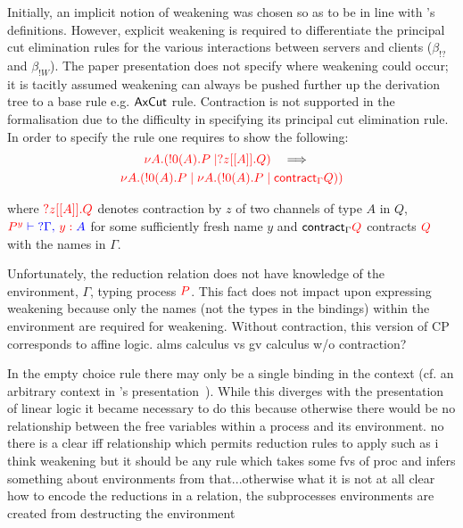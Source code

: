 Initially, an implicit notion of weakening was chosen so as to be in line with
\citeauthor{Wadler:2014}'s definitions. However, explicit weakening is
required to differentiate the principal cut elimination rules for the various
interactions between servers and clients ($\beta_{!?}$ and $\beta_{!W}$). The
paper presentation does not specify where weakening could occur; it is tacitly
assumed weakening can always be pushed further up the derivation tree to a
base rule e.g. $\textsf{Ax}\textsf{Cut}$ rule. Contraction is not supported in the
formalisation due to the difficulty in specifying its principal cut
elimination rule. In order to specify the rule one requires to show the
following:
\begin{gather*}
{\color{red}\nu A.(!0(A).P \mid ?z[[A]].Q)}
\quad \Longrightarrow \quad \\
{\color{red} \nu A.(!0(A).P \mid \nu A.(!0(A).P \mid \textsf{contract}_{\Gamma} Q))}
\end{gather*}

where ${\color{red} ?z[[A]].Q}$ denotes contraction by $z$ of two channels of type $A$
in $Q$, ${\color{red} P^y} {\color{blue} {} \vdash {}} {\color{blue} {?\Gamma} ,\, {\color{red} y:{}}A}$ for some
sufficiently fresh name $y$ and $\textsf{contract}_{\Gamma} {\color{red} Q}$ contracts
${\color{red} Q}$ with the names in $\Gamma$.

Unfortunately, the reduction relation does not have knowledge of the
environment, $\Gamma$, typing process ${\color{red} P}$. This fact does not impact upon
expressing weakening because only the names (not the types in the bindings)
within the environment are required for weakening. Without contraction, this
version of CP corresponds to affine logic. alms calculus vs gv calculus w/o
contraction?

In the empty choice rule there may only be a single binding in the context
(cf. an arbitrary context in \citeauthor{Wadler:2014}'s
presentation~\cite{Wadler:2014}). While this diverges with the presentation of
linear logic it became necessary to do this because otherwise there would be
no relationship between the free variables within a process and its
environment. no there is a clear iff relationship which permits reduction
rules to apply such as i think weakening but it should be any rule which takes
some fvs of proc and infers something about environments from that...otherwise
what it is not at all clear how to encode the reductions in a relation, the
subprocesses environments are created from destructing the environment


%

